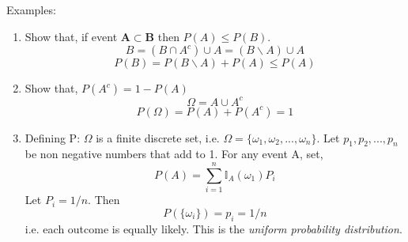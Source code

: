 \documentclass[12pt]{article}
\begin{document}
Examples: 
\begin{enumerate}[label=(\roman*)]
    \item Show that, if event $\mathbf{A \subset B}$ then $P(A) \le P(B)$. 
    $$B = (B \cap A^c) \cup A = (B \backslash A) \cup A$$
    $$P(B) = P(B \backslash A) + P(A) \le P(A)$$
    \item Show that, $P(A^c) = 1 - P(A)$
    $$ \Omega = A \cup A^c $$
    $$P(\Omega) =P(A) + P(A^c) = 1$$
    \item Defining P: $ \Omega $ is a finite discrete set, i.e. $ \Omega=\{\omega_1,\omega_2,...,\omega_n\} $. Let $p_1,p_2,...,p_n$ be non negative numbers that add to 1. For any event A, set,
    $$ P(A) = \sum_{i=1}^n\mathbb{I}_A(\omega_1)P_i $$ 
    Let $P_i = 1/n$. Then 
    $$P(\{\omega_i\}) = p_i = 1/n$$
    i.e. each outcome is equally likely. This is the \textit{uniform probability distribution}.
\end{enumerate}
\end{document}
